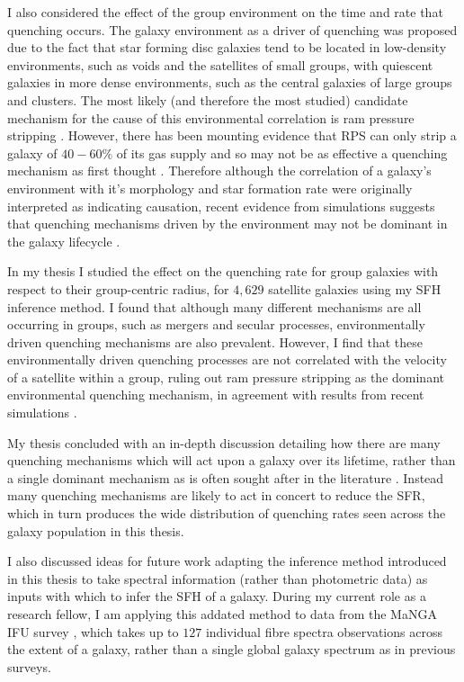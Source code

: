 \documentclass[12pt, usenatbib]{article}
\begin{document}
I also considered the effect of the group environment on the time and rate that quenching occurs. The galaxy environment as a driver of quenching was proposed due to the fact that star forming disc galaxies tend to be located in low-density environments, such as voids and the satellites of small groups, with quiescent galaxies in more dense environments, such as the central galaxies of large groups and clusters. The most likely (and therefore the most studied) candidate mechanism for the cause of this environmental correlation is ram pressure stripping \citep{abadi99, poggianti99}. However, there has been mounting evidence that RPS can only strip a galaxy of $40-60\%$ of its gas supply \citep{fillingham16} and so may not be as effective a quenching mechanism as first thought \citep{emerick16}. Therefore although the correlation of a galaxy's environment with it's morphology and star formation rate were originally interpreted as indicating causation, recent evidence from simulations suggests that quenching mechanisms driven by the environment may not be dominant in the galaxy lifecycle \citep{kimm11, hirschmann14, wang14, phillips15}.

In my thesis I studied the effect on the quenching rate for group galaxies with respect to their group-centric radius, for $4,629$ satellite galaxies using my SFH inference method. I found that although many different mechanisms are all occurring in groups, such as mergers and secular processes, environmentally driven quenching mechanisms are also prevalent. However, I find that these environmentally driven quenching processes are not correlated with the velocity of a satellite within a group, ruling out ram pressure stripping as the dominant environmental quenching mechanism, in agreement with results from recent simulations \citep{fillingham16, emerick16}. 

My thesis concluded with an in-depth discussion detailing how there are many quenching mechanisms which will act upon a galaxy over its lifetime, rather than a single dominant mechanism as is often sought after in the literature \citep[e.g.][]{muzzin12, schawinski14, foltz15, woo15, balogh16, darvish16, huertascompany16}. Instead many quenching mechanisms are likely to act in concert to reduce the SFR, which in turn produces the wide distribution of quenching rates seen across the galaxy population in this thesis. 

I also discussed ideas for future work adapting the inference method introduced in this thesis to take spectral information (rather than photometric data) as inputs with which to infer the SFH of a galaxy. During my current role as a research fellow, I am applying this addated method to data from the MaNGA IFU survey \citep{bundy15}, which takes up to $127$ individual fibre spectra observations across the extent of a galaxy, rather than a single global galaxy spectrum as in previous surveys. 
\end{document}
